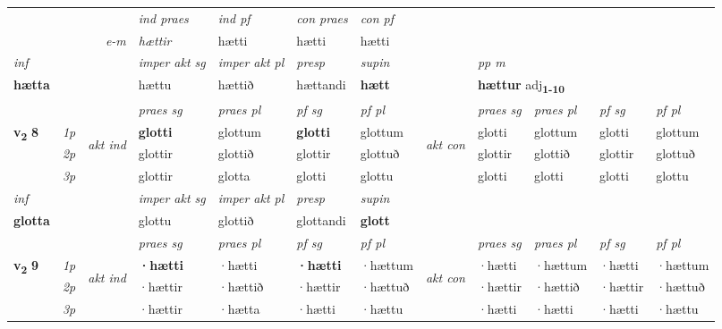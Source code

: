 \begin{longtable}[l]{X>{\footnotesize\itshape}llXXXXlXXXX}
   && &  \textit{ind praes} & \textit{ind pf} & \textit{con praes} & \textit{con pf} \\*
\multicolumn{3}{r}{\textit{e-m}} & hættir & hætti & hætti & hætti \\*

\cmidrule{4-7}
   {\textit{inf}} & &  & \textit{imper akt sg} & \textit{imper akt pl}   & \textit{presp} & \textit{supin}  && \textit{pp m} \\*
  {\textbf{hætta}} & && hættu  & hættið   & hættandi &  \textbf{hætt}  && \multicolumn{2}{l}{\textbf{hættur} adj\textbf{\textsubscript{1-10}}} \\*

\midrule

 & &   & \textit{praes sg}  & \textit{praes pl}    & \textit{ pf sg} & \textit{pf pl} & & \textit{praes sg}  & \textit{praes pl}    & \textit{pf sg} & \textit{pf pl }  \\ \cmidrule{4-7} \cmidrule{9-12}
 \multirow{2}{*}{{{\textbf{v{\textsubscript{2}}} \Large{\textbf{8}}}}}  & 1p & \multirow{3}{*}{\begin{turn}{90}\textit{akt ind}\end{turn}} & \textbf{glotti} & glottum & \textbf{glotti} & glottum & \multirow{3}{*}{\begin{turn}{90}\textit{akt con}\end{turn}} &glotti & glottum & glotti & glottum\\*
 & 2p &  &  glottir  & glottið & glottir & glottuð & & glottir & glottið & glottir & glottuð \\*
 & 3p &  & glottir & glotta & glotti & glottu & & glotti & glotti& glotti & glottu \\*
\cmidrule{4-7} \cmidrule{9-12}

   {\textit{inf}} & &  & \textit{imper akt sg} & \textit{imper akt pl}   & \textit{presp} & \textit{supin}   \\*
  {\textbf{glotta}} & && glottu  & glottið   & glottandi &  \textbf{glott}   \\*

\midrule
 
   \midrule
 & &   & \textit{praes sg}  & \textit{praes pl}    & \textit{ pf sg} & \textit{pf pl} & & \textit{praes sg}  & \textit{praes pl}    & \textit{pf sg} & \textit{pf pl }  \\ \cmidrule{4-7} \cmidrule{9-12}
 \multirow{2}{*}{{{\textbf{v{\textsubscript{2}}} \Large{\textbf{9}}}}}  & 1p & \multirow{3}{*}{\begin{turn}{90}\textit{akt ind}\end{turn}} & \textbf{·hætti} & ·hætti & \textbf{·hætti} & ·hættum & \multirow{3}{*}{\begin{turn}{90}\textit{akt con}\end{turn}} &·hætti & ·hættum & ·hætti & ·hættum\\*
 & 2p &  &  ·hættir  & ·hættið & ·hættir & ·hættuð & & ·hættir & ·hættið & ·hættir & ·hættuð \\*
 & 3p &  & ·hættir & ·hætta & ·hætti & ·hættu & & ·hætti & ·hætti& ·hætti & ·hættu \\*
\cmidrule{4-7} \cmidrule{9-12}


\end{longtable}
